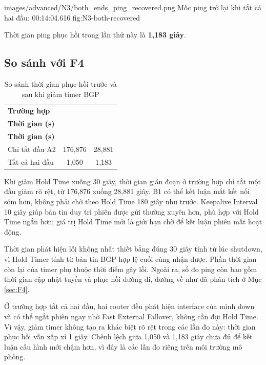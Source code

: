 \partzeroimage
{images/advanced/N3/both_ends_ping_recovered.png}
{Mốc ping trở lại khi tắt cả hai đầu: 00:14:04.616}
{fig:N3-both-recovered}

Thời gian ping phục hồi trong lần thử này
là \textbf{1,183 giây}.

\subsection{So sánh với F4}

\begin{table}[H]
\centering
\caption{So sánh thời gian phục hồi trước và sau khi giảm timer BGP}
\label{tab:N3-comparison}
\small
\renewcommand{\arraystretch}{1.3}
\begin{tabularx}{\textwidth}{X c c}
\toprule
\textbf{Trường hợp} &
\makecell{\textbf{F4: timer 60/180}\\\textbf{Thời gian (s)}} &
\makecell{\textbf{N3: timer 10/30}\\\textbf{Thời gian (s)}} \\
\midrule
Chỉ tắt đầu A2 & 176,876 & 28,881 \\
Tắt cả hai đầu & 1,050 & 1,183 \\
\bottomrule
\end{tabularx}
\end{table}

Khi giảm Hold Time xuống 30 giây,
thời gian gián đoạn ở trường hợp chỉ tắt
một đầu giảm rõ rệt, từ 176,876 xuống
28,881 giây.
B1 có thể kết luận mất kết nối sớm hơn,
không phải chờ theo Hold Time 180 giây như trước.
Keepalive Interval 10 giây giúp bản tin
duy trì phiên được gửi thường xuyên hơn,
phù hợp với Hold Time ngắn hơn;
giá trị Hold Time mới là giới hạn chờ
để kết luận phiên mất hoạt động.

Thời gian phát hiện lỗi không nhất thiết
bằng đúng 30 giây tính từ lúc shutdown,
vì Hold Timer tính từ bản tin BGP hợp lệ
cuối cùng nhận được.
Phần thời gian còn lại của timer
phụ thuộc thời điểm gây lỗi.
Ngoài ra, số đo ping còn bao gồm
thời gian cập nhật tuyến và phục hồi
đường đi, đường về như đã phân tích
ở Mục \ref{sec:F4}.

Ở trường hợp tắt cả hai đầu,
hai router đều phát hiện interface của mình down
và có thể ngắt phiên ngay nhờ
Fast External Fallover,
không cần đợi Hold Time.
Vì vậy, giảm timer không tạo ra
khác biệt rõ rệt trong các lần đo này:
thời gian phục hồi vẫn xấp xỉ 1 giây.
Chênh lệch giữa 1,050 và 1,183 giây
chưa đủ để kết luận cấu hình mới chậm hơn,
vì đây là các lần đo riêng trên môi trường mô phỏng.

\newpage

